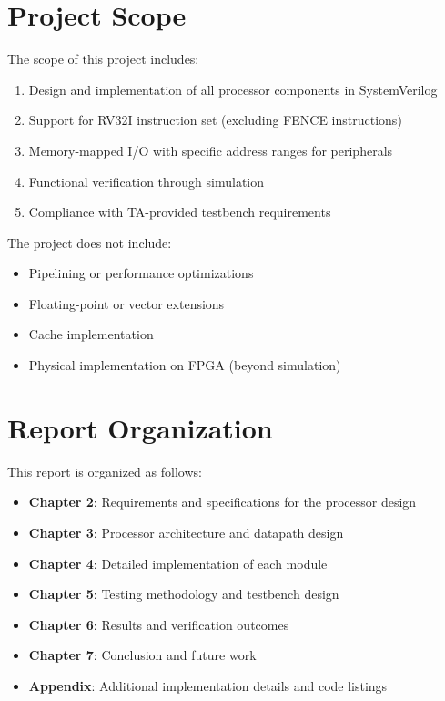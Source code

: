 \section{Project Scope}

The scope of this project includes:

\begin{enumerate}
    \item Design and implementation of all processor components in SystemVerilog
    \item Support for RV32I instruction set (excluding FENCE instructions)
    \item Memory-mapped I/O with specific address ranges for peripherals
    \item Functional verification through simulation
    \item Compliance with TA-provided testbench requirements
\end{enumerate}

The project does not include:
\begin{itemize}
    \item Pipelining or performance optimizations
    \item Floating-point or vector extensions
    \item Cache implementation
    \item Physical implementation on FPGA (beyond simulation)
\end{itemize}

\section{Report Organization}

This report is organized as follows:

\begin{itemize}
    \item \textbf{Chapter 2}: Requirements and specifications for the processor design
    \item \textbf{Chapter 3}: Processor architecture and datapath design
    \item \textbf{Chapter 4}: Detailed implementation of each module
    \item \textbf{Chapter 5}: Testing methodology and testbench design
    \item \textbf{Chapter 6}: Results and verification outcomes
    \item \textbf{Chapter 7}: Conclusion and future work
    \item \textbf{Appendix}: Additional implementation details and code listings
\end{itemize}

